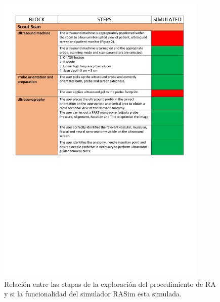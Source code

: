 %  
% 
% 
\begin{figure}[h]
    \centering
    \includegraphics[trim={1cm 14cm 1cm 1cm},clip,width=0.9\textwidth]{PDFs/RA1.pdf}
       \caption{Relación entre las etapas de la exploración del procedimiento de \ac{RA} y si la funcionalidad del simulador \ac{RASim} esta simulada.\label{fig:RAsteps1} }
    
\end{figure}
